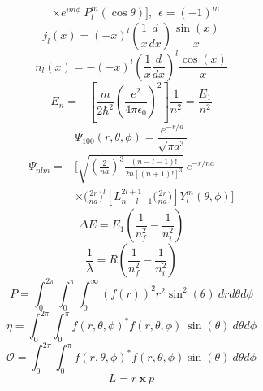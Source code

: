 \documentclass[10pt]{article}
\begin{document}
\begin{multicols}{3}
\begin{equation*}
\begin{split}
&\times e^{im\phi} \ P_{l}^{m}(\cos{\theta})\Bigg],\hspace{5pt} \epsilon=(-1)^m 
\end{split}
\end{equation*}
\begin{equation*}
j_l(x)=(-x)^l\left(\frac{1}{x}\frac{d}{dx}\right)\frac{\sin{(x)}}{x}
\end{equation*}
\begin{equation*}
n_l(x)=-(-x)^l\left(\frac{1}{x}\frac{d}{dx}\right)^l\frac{\cos{(x)}}{x}
\end{equation*}
\begin{equation*}
E_n=-\left[\frac{m}{2\hbar^2}\left(\frac{e^2}{4\pi\epsilon_0}\right)^2\right]\frac{1}{n^2}=\frac{E_1}{n^2}
\end{equation*}
\begin{equation*}
\Psi_{100}(r,\theta,\phi)=\frac{e^{-r/a}}{\sqrt{\pi a^3}}
\end{equation*}
\begin{equation*}
\begin{split}
\Psi_{nlm}=&\Bigg[\sqrt{\left(\frac{2}{na}\right)^3\frac{(n-l-1)!}{2n[(n+1)!]^3}} \ e^{-r/na} \\
&\times\Big(\frac{2r}{na}\Big)^l\left[L_{n-l-1}^{2l+1}\Big(\frac{2r}{na}\Big)\right]Y_{l}^{m}(\theta,\phi)\Bigg]
\end{split}
\end{equation*}
\begin{equation*}
\Delta E=E_1\left(\frac{1}{n_{f}^{2}}-\frac{1}{n_{i}^{2}}\right)
\end{equation*}
\begin{equation*}
\frac{1}{\lambda}=R\left(\frac{1}{n_{f}^{2}}-\frac{1}{n_{i}^{2}}\right)
\end{equation*}
\begin{equation*}
P=\int_{0}^{2\pi}\int_{0}^{\pi}\int_{0}^{\infty}\left(f(r)\right)^2r^2\sin^2{(\theta)} \ dr d\theta d\phi
\end{equation*}
\begin{equation*}
\eta=\int_{0}^{2\pi}\int_{0}^{\pi}f(r,\theta,\phi)^*f(r,\theta,\phi) \ \sin{(\theta)}\  d\theta d\phi
\end{equation*}
\begin{equation*}
\mathcal{O}=\int_{0}^{2\pi}\int_{0}^{\pi}f(r,\theta,\phi)^*f(r,\theta,\phi) \sin{(\theta)}\ d\theta d\phi 
\end{equation*}
\begin{equation*}
L=r \ \textbf{x} \ p
\end{equation*}

\end{multicols}
\end{document}
